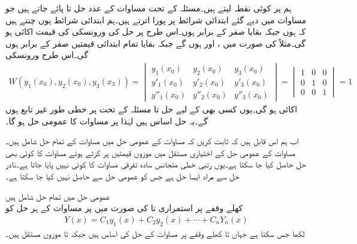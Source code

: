 ہم  پر کوئی نقطہ  لیتے ہیں۔مسئلہ  کے تحت مساوات  کے  عدد حل  تا  پائے جاتے ہیں جو مساوات  میں دیے گئے  ابتدائی شرائط پر پورا اترتے ہیں۔ہم ابتدائی شرائط یوں چنتے ہیں کہ  ہوں جبکہ بقایا  صفر کے برابر ہوں۔اس طرح  پر حل کی ورونسکی کی قیمت اکائی  ہو گی۔مثلاً  کی صورت میں  ،  اور  ہوں گے جبکہ بقایا تمام ابتدائی قیمتیں صفر کے برابر ہوں گی۔اس طرح ورونسکی
\begin{align*}
W(y_1(x_0),y_2(x_0),y_3(x_3))=
\begin{vmatrix}
y_1(x_0) & y_2(x_0) & y_3(x_0)\\
y'_1(x_0) & y'_2(x_0) & y'_3(x_0)\\
y''_1(x_0) & y''_2(x_0) & y''_3(x_0)
\end{vmatrix}
=
\begin{vmatrix}
1&0&0\\
0&1&0\\
0&0&1
\end{vmatrix}
=1
\end{align*}
اکائی ہو گی۔یوں کسی بھی  کے لیے  حل  تا  مسئلہ  کے تحت  پر خطی طور غیر تابع ہوں گے۔یہ حل اساس ہیں لہٰذا  پر مساوات  کا عمومی حل  ہو گا۔

اب ہم اس قابل ہیں کہ ثابت کریں کہ مساوات  کے عمومی حل میں مساوات  کے تمام حل شامل ہیں۔مساوات  کے عمومی حل کے اختیاری مستقل میں موزوں قیمتیں پر کرتے ہوئے مساوات   کا کوئی بھی حل حاصل کیا جا سکتا ہے۔یوں  رتبی خطی متجانس سادہ تفرقی مساوات  کا کوئی  نہیں پایا جاتا ہے۔نادر حل سے مراد ایسا حل ہے جس کو عمومی حل سے حاصل نہیں کیا جا سکتا ہے۔ 

\quad عمومی حل میں تمام حل شامل ہیں\\
کھلے وقفے  پر استمراری  تا  کی صورت میں  پر مساوات  کے ہر حل  کو
\begin{align}
Y(x)=C_1y_1(x)+C_2y_2(x)+\cdots+C_nY_n(x)
\end{align}
لکھا جس سکتا ہے جہاں  تا  کھلے وقفے  پر مساوات   کے حل کی اساس ہیں جبکہ  تا  موزوں مستقل ہیں۔

